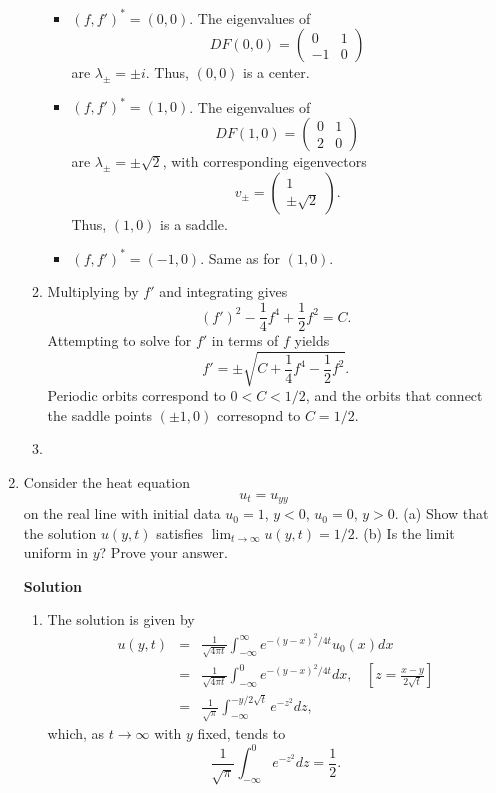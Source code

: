 \documentclass{article}
\begin{document}
\begin{enumerate}
\begin{enumerate}
\begin{itemize}
\item \((f,f')^* = (0,0)\).  The eigenvalues of
\[DF(0,0) = \left( \begin{array}{cc} 0 & 1 \\ -1 & 0 \end{array} \right)\]
are \(\lambda_{\pm} = \pm i\).  Thus, \((0,0)\) is a center.

\item \((f,f')^* = (1,0)\).  The eigenvalues of
\[DF(1,0) = \left( \begin{array}{cc} 0 & 1 \\ 2 & 0 \end{array} \right)\]
are \(\lambda_{\pm} = \pm \sqrt{2}\), with corresponding eigenvectors
\[v_{\pm} = \left( \begin{array}{c} 1 \\ \pm \sqrt{2} \end{array} \right).\]
Thus, \((1,0)\) is a saddle.

\item \((f,f')^* = (-1,0)\).  Same as for \((1,0)\).

\end{itemize}

\item Multiplying by \(f'\) and integrating gives
\[(f')^2 - \frac{1}{4} f^4 + \frac{1}{2} f^2 = C.\]
Attempting to solve for \(f'\) in terms of \(f\) yields
\[f' = \pm \sqrt{C + \frac{1}{4} f^4 - \frac{1}{2} f^2}.\]
Periodic orbits correspond to \(0 < C < 1/2\), and the orbits that connect the saddle points \((\pm 1, 0)\) corresopnd to \(C = 1/2\).

\item

\end{enumerate}



\item Consider the heat equation
\[u_t = u_{yy}\]
on the real line with initial data \(u_0 = 1\), \(y < 0\), \(u_0 = 0\), \(y > 0\).  (a) Show that the solution \(u(y,t)\) satisfies \(\lim_{t \to \infty} u(y,t) = 1/2\).  (b) Is the limit uniform in \(y\)?  Prove your answer.

{\bf Solution}

\begin{enumerate}
\item The solution is given by
\begin{eqnarray*}
u(y,t) &  =  & \frac{1}{\sqrt{4 \pi t}} \int_{-\infty}^{\infty} e^{-(y - x)^2 / 4 t} u_0(x) dx \\
       &  =  & \frac{1}{\sqrt{4 \pi t}} \int_{-\infty}^0 e^{-(y - x)^2 / 4 t} dx, \ \ \ \ \left[ z = \frac{x - y}{2 \sqrt{t}} \right] \\
       &  =  & \frac{1}{\sqrt{\pi}} \int_{-\infty}^{-y / 2 \sqrt{t}} e^{-z^2} dz,
\end{eqnarray*}
which, as \(t \to \infty\) with \(y\) fixed, tends to
\[\frac{1}{\sqrt{\pi}} \int_{-\infty}^0 e^{-z^2} dz = \frac{1}{2}.\]


\end{enumerate}
\end{enumerate}
\end{document}
